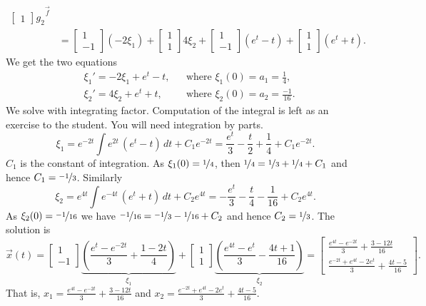 \begin{exampleSol}
\begin{equation*}
\begin{split}
{\begin{bmatrix}
1
\end{bmatrix} g_2
}^{\vec{f}}
\\
& =
\begin{bmatrix}
1 \\
-1
\end{bmatrix} (-2\xi_1) +
\begin{bmatrix}
1 \\
1
\end{bmatrix} 4\xi_2
+
\begin{bmatrix}
1 \\
-1
\end{bmatrix} (e^t - t)
+
\begin{bmatrix}
1 \\
1
\end{bmatrix} (e^t + t) .
\end{split}
\end{equation*}
We get the two equations
\begin{align*}
& \xi_1' = -2\xi_1 + e^t -t, & & \text{where } \xi_1(0) = a_1 = \frac{1}{4} , \\
& \xi_2' = 4\xi_2 + e^t + t, & & \text{where } \xi_2(0) = a_2 = \frac{-1}{16} .
\end{align*}
We solve with integrating factor.  Computation of the integral is left as
an exercise to the student.  You will need integration by parts.
\begin{equation*}
\xi_1 = e^{-2t}\int e^{2t} \, (e^t-t) \, dt + C_1 e^{-2t} = 
\frac{e^t}{3}-\frac{t}{2}+\frac{1}{4}+C_1 e^{-2t} .
\end{equation*}
$C_1$ is the constant of integration.
As $\xi_1(0) = \nicefrac{1}{4}$, then $\nicefrac{1}{4}= \nicefrac{1}{3}
+ \nicefrac{1}{4} + C_1$ and hence
$C_1 = \nicefrac{-1}{3}$.
Similarly
\begin{equation*}
\xi_2 = e^{4t}\int e^{-4t} \, (e^t+ t) \, dt + C_2 e^{4t} = 
-\frac{e^t}{3}-\frac{t}{4}-\frac{1}{16} + C_2 e^{4t} .
\end{equation*}
As $\xi_2(0) = \nicefrac{-1}{16}$ we have $\nicefrac{-1}{16}= \nicefrac{-1}{3}
-\nicefrac{1}{16} + C_2$ and hence
$C_2 = \nicefrac{1}{3}$.
The solution is
\begin{equation*}
\vec{x}(t)=
\begin{bmatrix}
1 \\
-1
\end{bmatrix}
\underbrace{\left( \frac{e^t-e^{-2t}}{3}+\frac{1-2t}{4} \right)}%
_{\xi_1} +
\begin{bmatrix}
1 \\
1
\end{bmatrix}
\underbrace{\left( \frac{e^{4t}-e^t}{3}-\frac{4t+1}{16} \right)}%
_{\xi_2}
=
\begin{bmatrix}
\frac{e^{4t}-e^{-2t}}{3}+\frac{3-12t}{16} \\
\frac{e^{-2t}+e^{4t}-2e^t}{3}+\frac{4t-5}{16}
\end{bmatrix} .
\end{equation*}
That is,
$x_1 = \frac{e^{4t}-e^{-2t}}{3}+\frac{3-12t}{16}$
and
$x_2 = \frac{e^{-2t}+e^{4t}-2e^t}{3}+\frac{4t-5}{16}$.
\end{exampleSol}

